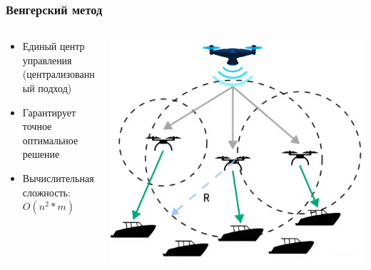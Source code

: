 \documentclass{beamer}
\begin{document}
	\begin{frame}
		\frametitle{Венгерский метод}
		\begin{columns}[T] %
			\begin{column}{0.5\textwidth} %
				\begin{itemize}
					\item Единый центр управления (централизованный подход)
                   				 \item Гарантирует точное оптимальное решение
                   				 \item Вычислительная сложность: $O(n^2 * m)$
				\end{itemize}
			\end{column}
			\begin{column}{0.5\textwidth} %
				\centering
				\includegraphics[width=\textwidth,height=0.85\textheight,keepaspectratio]{mrta2.jpeg}
			\end{column}
		\end{columns}
	\end{frame}
                
\end{document}
